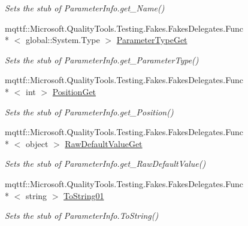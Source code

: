 \begin{DoxyCompactItemize}
\begin{DoxyCompactList}\small\item\em Sets the stub of Parameter\-Info.\-get\-\_\-\-Name()\end{DoxyCompactList}\item 
mqttf\-::\-Microsoft.\-Quality\-Tools.\-Testing.\-Fakes.\-Fakes\-Delegates.\-Func\\*
$<$ global\-::\-System.\-Type $>$ \hyperlink{class_system_1_1_reflection_1_1_fakes_1_1_stub_parameter_info_a5419df1ede1af123875819146dfcba8a}{Parameter\-Type\-Get}
\begin{DoxyCompactList}\small\item\em Sets the stub of Parameter\-Info.\-get\-\_\-\-Parameter\-Type()\end{DoxyCompactList}\item 
mqttf\-::\-Microsoft.\-Quality\-Tools.\-Testing.\-Fakes.\-Fakes\-Delegates.\-Func\\*
$<$ int $>$ \hyperlink{class_system_1_1_reflection_1_1_fakes_1_1_stub_parameter_info_adc8e4d46c503987e745b77a7d94536c5}{Position\-Get}
\begin{DoxyCompactList}\small\item\em Sets the stub of Parameter\-Info.\-get\-\_\-\-Position()\end{DoxyCompactList}\item 
mqttf\-::\-Microsoft.\-Quality\-Tools.\-Testing.\-Fakes.\-Fakes\-Delegates.\-Func\\*
$<$ object $>$ \hyperlink{class_system_1_1_reflection_1_1_fakes_1_1_stub_parameter_info_a26b80d02fd4f13054f4754c58054f357}{Raw\-Default\-Value\-Get}
\begin{DoxyCompactList}\small\item\em Sets the stub of Parameter\-Info.\-get\-\_\-\-Raw\-Default\-Value()\end{DoxyCompactList}\item 
mqttf\-::\-Microsoft.\-Quality\-Tools.\-Testing.\-Fakes.\-Fakes\-Delegates.\-Func\\*
$<$ string $>$ \hyperlink{class_system_1_1_reflection_1_1_fakes_1_1_stub_parameter_info_a071a73bbfc4e40cfb0769002dd583335}{To\-String01}
\begin{DoxyCompactList}\small\item\em Sets the stub of Parameter\-Info.\-To\-String()\end{DoxyCompactList}\end{DoxyCompactItemize}
